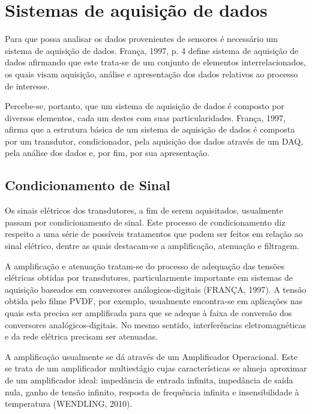 \documentclass[
	12pt,				
	oneside,			
	a4paper,			
	english,			
	brazil,			
	]{abntex2ppgsi}
\begin{document}
\section{\textbf{Sistemas de aquisição de dados}}

Para que possa analisar os dados provenientes de sensores é necessário um sistema de aquisição de dados. França, 1997, p. 4 define sistema de aquisição de dados afirmando que este trata-se de um conjunto de elementos interrelacionados, os quais visam aquisição, análise e apresentação dos dados relativos ao processo de interesse.

Percebe-se, portanto, que um sistema de aquisição de dados é composto por diversos elementos, cada um destes com suas particularidades. França, 1997, afirma que a estrutura básica de um sistema de aquisição de dados é composta por um transdutor, condicionador, pela aquisição dos dados através de um DAQ, pela análise dos dados e, por fim, por sua apresentação. 


\subsection{\textbf{Condicionamento de Sinal}}

Os sinais elétricos dos transdutores, a fim de serem aquisitados, usualmente passam por condicionamento de sinal. Este processo de condicionamento diz respeito a uma série de possíveis tratamentos que podem ser feitos em relação ao sinal elétrico, dentre as quais destacam-se a amplificação, atenuação e filtragem. 

A amplificação e atenuação tratam-se do processo de adequação das tensões elétricas obtidas por transdutores, particularmente importante em sistemas de aquisição baseados em conversores análogicos-digitais (FRANÇA, 1997). A tensão obtida pelo filme PVDF, por exemplo, usualmente encontra-se em aplicações nas quais esta precisa ser amplificada para que se adeque à faixa de conversão dos conversores analógicos-digitais. No mesmo sentido, interferências eletromagnéticas e da rede elétrica precisam ser atenuadas. 

A amplificação usualmente se dá através de um Amplificador Operacional. Este se trata de um amplificador multiestágio cujas características se almeja aproximar de um amplificador ideal: impedância de entrada infinita, impedância de saída nula, ganho de tensão infinito, resposta de frequência infinita e insensibilidade à temperatura (WENDLING, 2010). 
\end{document}
